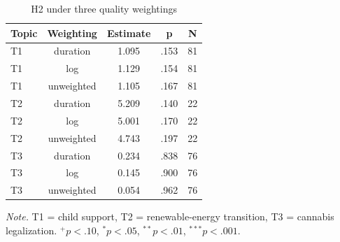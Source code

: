 \begin{table}[htbp]
\centering
\begin{threeparttable}
\caption{H2 under three quality weightings}
\label{tab:tab_sens_weighting}
\begin{tabular}{lcccc}
\toprule
  Topic & Weighting & Estimate & p & N \\
\midrule
  T1 & duration & 1.095 & .153 & 81 \\
  T1 & log & 1.129 & .154 & 81 \\
  T1 & unweighted & 1.105 & .167 & 81 \\
  T2 & duration & 5.209 & .140 & 22 \\
  T2 & log & 5.001 & .170 & 22 \\
  T2 & unweighted & 4.743 & .197 & 22 \\
  T3 & duration & 0.234 & .838 & 76 \\
  T3 & log & 0.145 & .900 & 76 \\
  T3 & unweighted & 0.054 & .962 & 76 \\
\bottomrule
\end{tabular}
\begin{tablenotes}\footnotesize\item \textit{Note.} T1 = child support, T2 = renewable-energy transition, T3 = cannabis legalization. $^{+}p<.10$, $^{*}p<.05$, $^{**}p<.01$, $^{***}p<.001$.\end{tablenotes}
\end{threeparttable}
\end{table}
